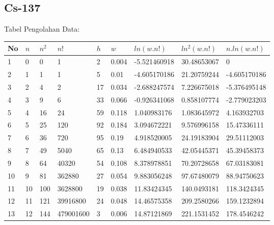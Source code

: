 \documentclass{article}
\begin{document}
			\subsection{Cs-137}
			Tabel Pengolahan Data:
			\begin{longtable}{@{}lllllllll@{}}
				\toprule
				No  & $n$  & $n^{2}$ & $n!$   & $h$   & $w$     & $ln(w.n!)$     & $ln^{2}(w.n!)$ & $n.ln(w.n!)$   \\ \midrule
				\endfirsthead
				\endhead
				\bottomrule
				\endfoot
				\endlastfoot
				1   & 0   & 0                    & 1           & 2   & 0.004 & -5.521460918 & 30.48653067                 & 0            \\
				2   & 1   & 1                    & 1           & 5   & 0.01  & -4.605170186 & 21.20759244                 & -4.605170186 \\
				3   & 2   & 4                    & 2           & 17  & 0.034 & -2.688247574 & 7.226675018                 & -5.376495148 \\
				4   & 3   & 9                    & 6           & 33  & 0.066 & -0.926341068 & 0.858107774                 & -2.779023203 \\
				5   & 4   & 16                   & 24          & 59  & 0.118 & 1.040983176  & 1.083645972                 & 4.163932703  \\
				6   & 5   & 25                   & 120         & 92  & 0.184 & 3.094672221  & 9.576996158                 & 15.47336111  \\
				7   & 6   & 36                   & 720         & 95  & 0.19  & 4.918520005  & 24.19183904                 & 29.51112003  \\
				8   & 7   & 49                   & 5040        & 65  & 0.13  & 6.484940533  & 42.05445371                 & 45.39458373  \\
				9   & 8   & 64                   & 40320       & 54  & 0.108 & 8.378978851  & 70.20728658                 & 67.03183081  \\
				10  & 9   & 81                   & 362880      & 27  & 0.054 & 9.883056248  & 97.67480079                 & 88.94750623  \\
				11  & 10  & 100                  & 3628800     & 19  & 0.038 & 11.83424345  & 140.0493181                 & 118.3424345  \\
				12  & 11  & 121                  & 39916800    & 24  & 0.048 & 14.46575358  & 209.2580266                 & 159.1232894  \\
				13  & 12  & 144                  & 479001600   & 3   & 0.006 & 14.87121869  & 221.1531452                 & 178.4546242  \\

\end{longtable}
\end{document}
